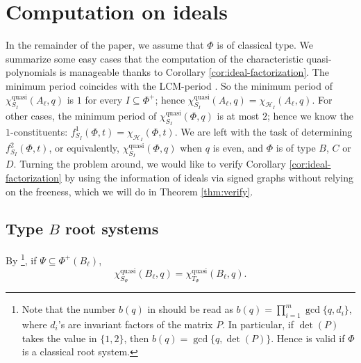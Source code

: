 \documentclass[12pt]{amsart}
\theoremstyle{plain}
\theoremstyle{definition}
\theoremstyle{remark}
\newcommand{\scH}{{\mathcal{H}}}
\newcommand{\quasi}{\operatorname{quasi}}
\begin{document}
\section{Computation on ideals} 
\label{sec:ideal} 
In the remainder of the paper, we assume that $\Phi$ is of classical type.
We summarize some easy cases that the computation of the characteristic quasi-polynomials is manageable thanks to Corollary \ref{cor:ideal-factorization}.
The minimum period coincides with the LCM-period \cite[Remark 3.3]{KTT10}. 
So the minimum period of $\chi^{\quasi}_{S_I}(A_\ell, q)$ is $1$ for every $I\subseteq\Phi^+$; hence $\chi^{\quasi}_{S_I}(A_\ell, q)=\chi_{\scH_I}(A_\ell,q)$.
For other cases, the minimum period of $\chi^{\quasi}_{S_I}(\Phi,q)$ is at most $2$; hence  we know the $1$-constituents: $f^1_{S_I}(\Phi,t)=\chi_{\scH_I}(\Phi,t)$. 
We are left with the task of determining  $f^2_{S_I}(\Phi, t)$, or equivalently, $\chi^{\quasi}_{S_I}(\Phi, q)$ when $q$ is even, and $\Phi$ is of type $B$, $C$ or $D$. 
Turning the problem around, we would like to verify Corollary \ref{cor:ideal-factorization} by using the information of ideals via signed graphs without relying on the freeness, which we will do in Theorem \ref{thm:verify}. 
 
\subsection{Type $B$ root systems}
By \cite[Theorem 4.1]{KTT07}\footnote{Note that the number $b(q)$ in \cite[Theorem 4.1]{KTT07} should be read as $b(q)=\prod_{i=1}^m\gcd\{q,d_i\}$, where $d_i$'s are invariant factors of the matrix $P$. 
In particular, if $\det(P)$ takes the value in $\{1,2\}$, then $b(q)=\gcd\{q,\det(P)\}$. 
Hence \cite[Theorem 4.1]{KTT07} is valid if $\Phi$ is a classical root system.}, if $\Psi\subseteq\Phi^+(B_\ell)$, 
\begin{equation*}\label{eq:B-TS}
\chi^{\quasi}_{S_\Psi}(B_\ell, q)=\chi^{\quasi}_{T_\Psi}(B_\ell, q).
\end{equation*}
\end{document}
